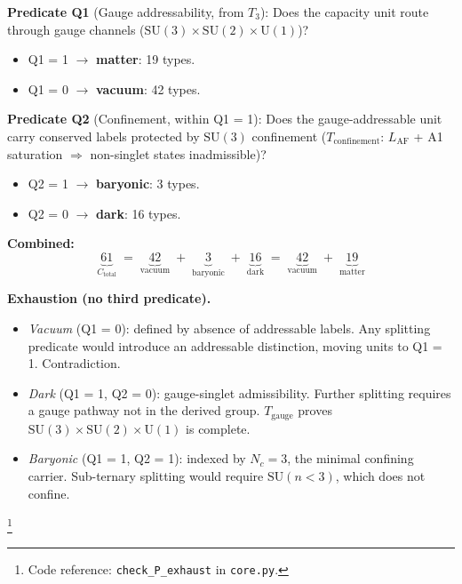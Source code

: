 \documentclass[11pt]{article}
\newenvironment{varlist}{\begin{itemize}[nosep,leftmargin=2em]}{\end{itemize}}
\newcommand{\coderef}[2]{\footnote{Code reference: \texttt{#1} in \texttt{#2}.}}
\newcommand{\SU}{\mathrm{SU}}
\newcommand{\U}{\mathrm{U}}
\begin{document}
\begin{tcolorbox}[apfbox, title={$P_{\mathrm{exhaust}}$ (Predicate Exhaustion --- MECE Partition)}]
\textbf{Predicate Q1} (Gauge addressability, from $T_3$): Does the capacity unit route through gauge channels ($\SU(3) \times \SU(2) \times \U(1)$)?
\begin{varlist}
\item Q1 = 1 $\to$ \textbf{matter}: 19 types.
\item Q1 = 0 $\to$ \textbf{vacuum}: 42 types.
\end{varlist}

\smallskip\noindent\textbf{Predicate Q2} (Confinement, within Q1 = 1): Does the gauge-addressable unit carry conserved labels protected by $\SU(3)$ confinement ($T_{\mathrm{confinement}}$: $L_{\mathrm{AF}}$ + A1 saturation $\Rightarrow$ non-singlet states inadmissible)?
\begin{varlist}
\item Q2 = 1 $\to$ \textbf{baryonic}: 3 types.
\item Q2 = 0 $\to$ \textbf{dark}: 16 types.
\end{varlist}

\smallskip\noindent\textbf{Combined:}
\begin{equation}
\underbrace{61}_{C_{\mathrm{total}}} \;=\; \underbrace{42}_{\text{vacuum}} \;+\; \underbrace{3}_{\text{baryonic}} \;+\; \underbrace{16}_{\text{dark}} \;=\; \underbrace{42}_{\text{vacuum}} \;+\; \underbrace{19}_{\text{matter}}
\label{eq:mece_partition}
\end{equation}

\smallskip\noindent\textbf{Exhaustion (no third predicate).}
\begin{varlist}
\item \textit{Vacuum} (Q1 = 0): defined by absence of addressable labels.  Any splitting predicate would introduce an addressable distinction, moving units to Q1 = 1.  Contradiction.
\item \textit{Dark} (Q1 = 1, Q2 = 0): gauge-singlet admissibility.  Further splitting requires a gauge pathway not in the derived group.  $T_{\mathrm{gauge}}$ proves $\SU(3) \times \SU(2) \times \U(1)$ is complete.
\item \textit{Baryonic} (Q1 = 1, Q2 = 1): indexed by $N_c = 3$, the minimal confining carrier.  Sub-ternary splitting would require $\SU(n < 3)$, which does not confine.
\end{varlist}
\coderef{check\_P\_exhaust}{core.py}
\end{tcolorbox}
\end{document}
